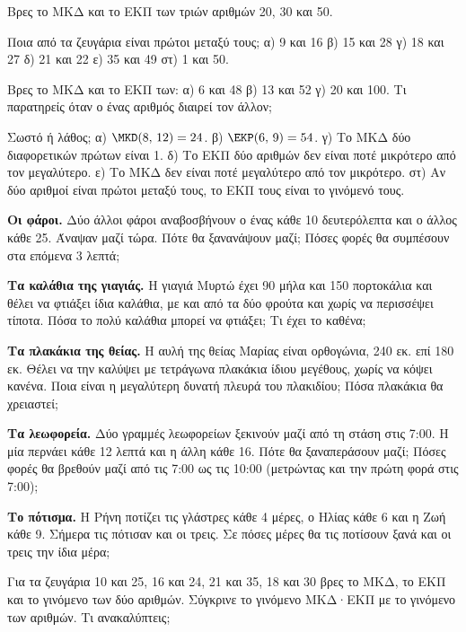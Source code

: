 \ex Βρες το ΜΚΔ και το ΕΚΠ των τριών αριθμών 20, 30 και 50.

\ex Ποια από τα ζευγάρια είναι πρώτοι μεταξύ τους; α) 9 και 16 \quad β) 15 και 28 \quad γ) 18 και 27 \quad δ) 21 και 22 \quad ε) 35 και 49 \quad στ) 1 και 50.

\ex Βρες το ΜΚΔ και το ΕΚΠ των: α) 6 και 48 \quad β) 13 και 52 \quad γ) 20 και 100. Τι παρατηρείς όταν ο ένας αριθμός διαιρεί τον άλλον;

\ex Σωστό ή λάθος; α) $\MKD(8,\,12)=24$. \quad β) $\EKP(6,\,9)=54$. \quad γ) Το ΜΚΔ δύο διαφορετικών πρώτων είναι 1. \quad δ) Το ΕΚΠ δύο αριθμών δεν είναι ποτέ μικρότερο από τον μεγαλύτερο. \quad ε) Το ΜΚΔ δεν είναι ποτέ μεγαλύτερο από τον μικρότερο. \quad στ) Αν δύο αριθμοί είναι πρώτοι μεταξύ τους, το ΕΚΠ τους είναι το γινόμενό τους.


\ex \textbf{Οι φάροι.} Δύο άλλοι φάροι αναβοσβήνουν ο ένας κάθε 10 δευτερόλεπτα και ο άλλος κάθε 25. Άναψαν μαζί τώρα. Πότε θα ξανανάψουν μαζί; Πόσες φορές θα συμπέσουν στα επόμενα 3 λεπτά;

\ex \textbf{Τα καλάθια της γιαγιάς.} Η γιαγιά Μυρτώ έχει 90 μήλα και 150 πορτοκάλια και θέλει να φτιάξει ίδια καλάθια, με και από τα δύο φρούτα και χωρίς να περισσέψει τίποτα. Πόσα το πολύ καλάθια μπορεί να φτιάξει; Τι έχει το καθένα;

\ex \textbf{Τα πλακάκια της θείας.} Η αυλή της θείας Μαρίας είναι ορθογώνια, 240 εκ. επί 180 εκ. Θέλει να την καλύψει με τετράγωνα πλακάκια ίδιου μεγέθους, χωρίς να κόψει κανένα. Ποια είναι η μεγαλύτερη δυνατή πλευρά του πλακιδίου; Πόσα πλακάκια θα χρειαστεί;

\ex \textbf{Τα λεωφορεία.} Δύο γραμμές λεωφορείων ξεκινούν μαζί από τη στάση στις 7:00. Η μία περνάει κάθε 12 λεπτά και η άλλη κάθε 16. Πότε θα ξαναπεράσουν μαζί; Πόσες φορές θα βρεθούν μαζί από τις 7:00 ως τις 10:00 (μετρώντας και την πρώτη φορά στις 7:00);

\ex \textbf{Το πότισμα.} Η Ρήνη ποτίζει τις γλάστρες κάθε 4 μέρες, ο Ηλίας κάθε 6 και η Ζωή κάθε 9. Σήμερα τις πότισαν και οι τρεις. Σε πόσες μέρες θα τις ποτίσουν ξανά και οι τρεις την ίδια μέρα;


\ex Για τα ζευγάρια 10 και 25, 16 και 24, 21 και 35, 18 και 30 βρες το ΜΚΔ, το ΕΚΠ και το γινόμενο των δύο αριθμών. Σύγκρινε το γινόμενο ΜΚΔ·ΕΚΠ με το γινόμενο των αριθμών. Τι ανακαλύπτεις;


